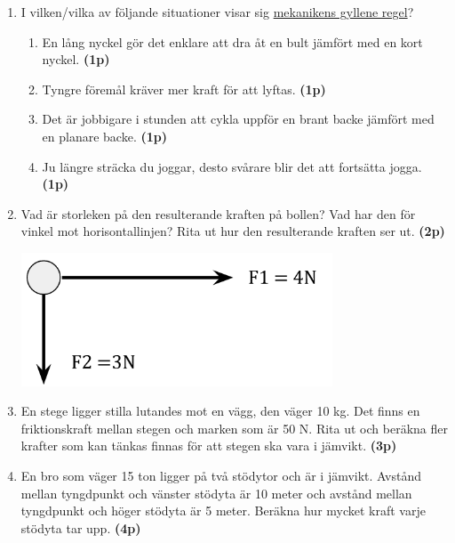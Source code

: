 \documentclass[11pt]{article}
\begin{document}
\begin{enumerate}[itemsep=0.5em]
              \newpage
        \item
              I vilken/vilka av följande situationer visar sig \uline{mekanikens gyllene regel}?
              \begin{enumerate}[label=\alph*)]
                      \item En lång nyckel gör det enklare att dra åt en bult jämfört med en kort nyckel. \textbf{(1p)}
                      \item Tyngre föremål kräver mer kraft för att lyftas. \textbf{(1p)}
                      \item Det är jobbigare i stunden att cykla uppför en brant backe jämfört med en planare backe. \textbf{(1p)}
                      \item Ju längre sträcka du joggar, desto svårare blir det att fortsätta jogga. \textbf{(1p)}
              \end{enumerate}

        \item
              Vad är storleken på den resulterande kraften på bollen? Vad har den för vinkel mot horisontallinjen? Rita ut hur den resulterande kraften ser ut. \textbf{(2p)}
              \begin{center}
                      \includegraphics[width=25em]{kraft1.png}
              \end{center}

        \item
              \begin{minipage}[t]{0.6\textwidth}
                      En stege ligger stilla lutandes mot en vägg, den väger 10 kg. Det finns en friktionskraft mellan stegen och marken som är 50 N. Rita ut och beräkna fler krafter som kan tänkas finnas för att stegen ska vara i jämvikt. \textbf{(3p)}
              \end{minipage}
              \hspace{2em}
              \begin{adjustbox}{valign=t}
                      
              \end{adjustbox}

        \item
              En bro som väger 15 ton ligger på två stödytor och är i jämvikt.  Avstånd mellan tyngdpunkt och vänster stödyta är 10 meter och avstånd mellan tyngdpunkt och höger stödyta är 5 meter.
              Beräkna hur mycket kraft varje stödyta tar upp. \textbf{(4p)}
              \begin{center}
                      
              \end{center}


\end{enumerate}
\end{document}
